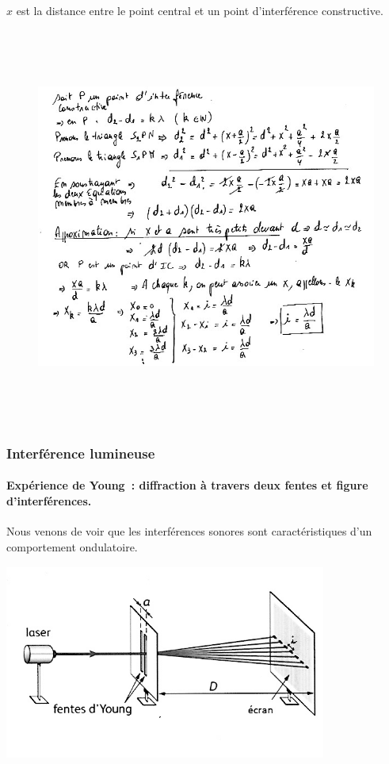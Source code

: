 $x$ est la distance entre le point central et un point d'interférence
constructive.

\begin{figure}
\centering
\includegraphics[width=17.253cm,height=13.09cm]{Pictures/100000010000025F000001F704069EFE234008BD.png}
\caption{}
\end{figure}

\subsubsection{Interférence lumineuse }

\paragraph{Expérience de Young~: diffraction à travers deux fentes
et figure d'interférences. }

Nous venons de voir que les interférences sonores sont caractéristiques
d'un comportement ondulatoire.

\includegraphics[width=10.592cm,height=6.443cm]{Pictures/100000010000025A000001696E99605075C8F3D0.png}

